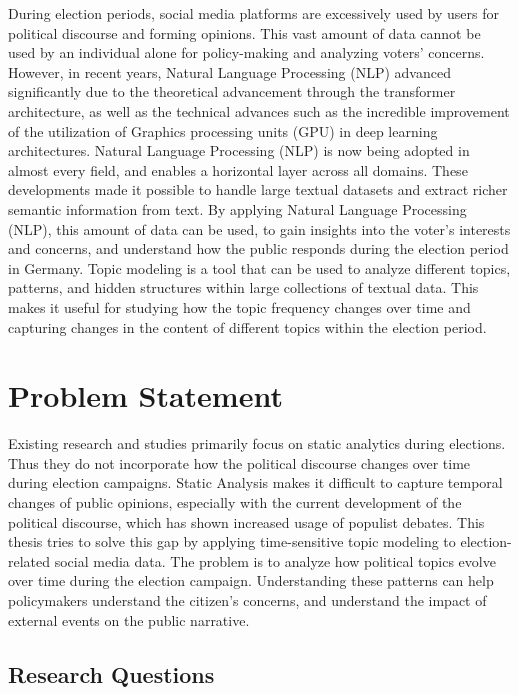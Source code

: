 During election periods, social media platforms are excessively used by users for political discourse and forming opinions. This vast amount of data cannot be used by an individual alone for policy-making and analyzing voters' concerns.
However, in recent years, Natural Language Processing (NLP) advanced significantly due to the theoretical advancement through the transformer architecture, as well as the technical advances such as the incredible improvement of the utilization of Graphics processing units (GPU) in deep learning architectures.
Natural Language Processing (NLP) is now being adopted in almost every field, and enables a horizontal layer across all domains.
These developments made it possible to handle large textual datasets and extract richer semantic information from text.
By applying Natural Language Processing (NLP), this amount of data can be used, to gain insights into the voter's interests and concerns, and understand how the public responds during the election period in Germany. Topic modeling is a tool that can be used to analyze different topics, patterns, and hidden structures within large collections of textual data. This makes it useful for studying how the topic frequency changes over time and capturing changes in the content of different topics within the election period.

\section{Problem Statement}\label{ch:1-problem}

Existing research and studies primarily focus on static analytics during elections. Thus they do not incorporate how the political discourse changes over time during election campaigns. Static Analysis makes it difficult to capture temporal changes of public opinions, especially with the current development of the political discourse, which has shown increased usage of populist debates.
This thesis tries to solve this gap by applying time-sensitive topic modeling to election-related social media data. The problem is to analyze how political topics evolve over time during the election campaign. Understanding these patterns can help policymakers understand the citizen's concerns, and understand the impact of external events on the public narrative.


\subsection{Research Questions}

